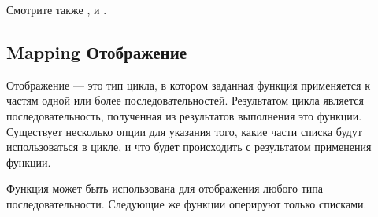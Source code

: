 Смотрите также ,  и
.

\subsection{Mapping Отображение}

Отображение --- это тип цикла, в котором заданная функция применяется к частям
одной или более последовательностей. Результатом цикла является
последовательность, полученная из результатов выполнения это функции.
Существует несколько опции для указания того, какие части списка будут
использоваться в цикле, и что будет происходить с результатом применения
функции.

Функция  может быть использована для отображения любого типа
последовательности.
Следующие же функции оперируют только списками.

